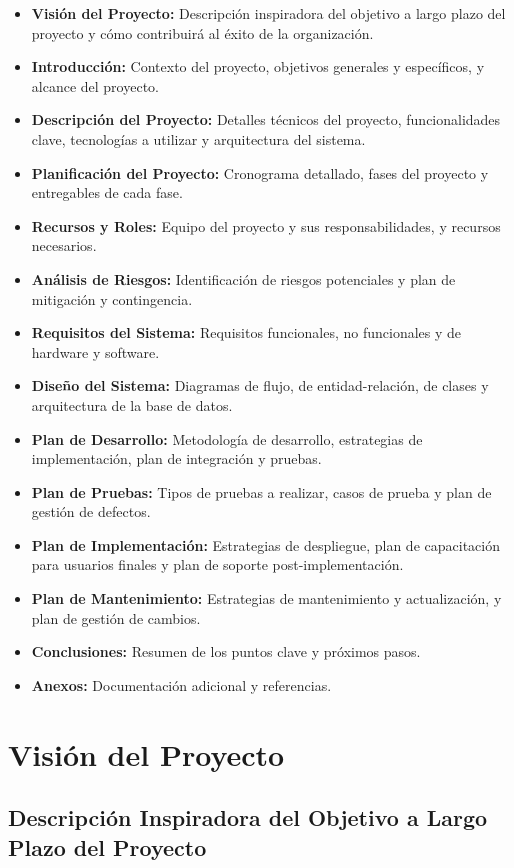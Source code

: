 \documentclass{article}
\begin{document}
\begin{itemize}
    \item \textbf{Visión del Proyecto:} Descripción inspiradora del objetivo a largo plazo del proyecto y cómo contribuirá al éxito de la organización.
    \item \textbf{Introducción:} Contexto del proyecto, objetivos generales y específicos, y alcance del proyecto.
    \item \textbf{Descripción del Proyecto:} Detalles técnicos del proyecto, funcionalidades clave, tecnologías a utilizar y arquitectura del sistema.
    \item \textbf{Planificación del Proyecto:} Cronograma detallado, fases del proyecto y entregables de cada fase.
    \item \textbf{Recursos y Roles:} Equipo del proyecto y sus responsabilidades, y recursos necesarios.
    \item \textbf{Análisis de Riesgos:} Identificación de riesgos potenciales y plan de mitigación y contingencia.
    \item \textbf{Requisitos del Sistema:} Requisitos funcionales, no funcionales y de hardware y software.
    \item \textbf{Diseño del Sistema:} Diagramas de flujo, de entidad-relación, de clases y arquitectura de la base de datos.
    \item \textbf{Plan de Desarrollo:} Metodología de desarrollo, estrategias de implementación, plan de integración y pruebas.
    \item \textbf{Plan de Pruebas:} Tipos de pruebas a realizar, casos de prueba y plan de gestión de defectos.
    \item \textbf{Plan de Implementación:} Estrategias de despliegue, plan de capacitación para usuarios finales y plan de soporte post-implementación.
    \item \textbf{Plan de Mantenimiento:} Estrategias de mantenimiento y actualización, y plan de gestión de cambios.
    \item \textbf{Conclusiones:} Resumen de los puntos clave y próximos pasos.
    \item \textbf{Anexos:} Documentación adicional y referencias.
\end{itemize}

\newpage
\section{Visión del Proyecto}

\subsection{Descripción Inspiradora del Objetivo a Largo Plazo del Proyecto}
\end{document}
